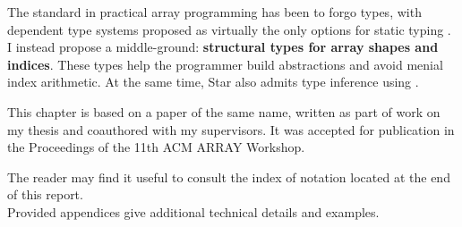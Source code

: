 The standard in practical array programming has been to forgo types, with dependent type systems proposed as virtually the only options for static typing \cite{dex}. I instead propose a middle-ground: \textbf{structural types for array shapes and indices}. These types help the programmer build abstractions and avoid menial index arithmetic. At the same time, Star also admits type inference using \inference{}.

This chapter is based on a paper of the same name, written as part of work on my thesis and coauthored with my supervisors. It was accepted for publication in the Proceedings of the 11th ACM ARRAY Workshop. 

\vfill
\begin{tcolorbox}[
    colback=violet!5!white,
    colframe=violet!70!black,
    title=\textsc{Notes for the Reader}
]
The reader may find it useful to consult the index of notation located at the end of this report. \\ 
Provided appendices give additional technical details and examples.
\end{tcolorbox}
